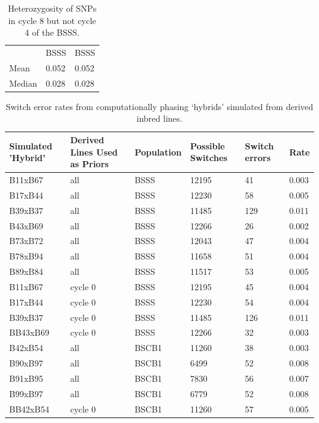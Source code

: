 \begin{table}
\caption{Heterozygosity of SNPs in cycle 8 but not cycle 4 of the BSSS. }
\begin{tabular}{  l | l | l | }
\multicolumn{1}{l}{} & \multicolumn{1}{l}{BSSS} & \multicolumn{1}{l}{BSSS}   \\ \cline{2-3}
	Mean & 0.052 & 0.052   \\ \cline{2-3}
	Median & 0.028 & 0.028   \\ \cline{2-3}
\end{tabular}
\end{table}



\begin{table}
\caption{Switch error rates from computationally phasing ‘hybrids’ simulated from derived inbred lines.}
\begin{tabular}{ | l | l | l | l | l | l | }

\hline
	\textbf{Simulated 'Hybrid'} & \textbf{Derived Lines Used as Priors} & \textbf{Population} & \textbf{Possible Switches} & \textbf{Switch errors} & \textbf{Rate} \\ \hline
	B11xB67 & all & BSSS & 12195 & 41 & 0.003 \\ \hline
	B17xB44 & all & BSSS & 12230 & 58 & 0.005 \\ \hline
	B39xB37 & all & BSSS & 11485 & 129 & 0.011 \\ \hline
	B43xB69 & all & BSSS & 12266 & 26 & 0.002 \\ \hline
	B73xB72 & all & BSSS & 12043 & 47 & 0.004 \\ \hline
	B78xB94 & all & BSSS & 11658 & 51 & 0.004 \\ \hline
	B89xB84 & all & BSSS & 11517 & 53 & 0.005 \\ \hline
	B11xB67 & cycle 0 & BSSS & 12195 & 45 & 0.004 \\ \hline
	B17xB44 & cycle 0 & BSSS & 12230 & 54 & 0.004 \\ \hline
	B39xB37 & cycle 0 & BSSS & 11485 & 126 & 0.011 \\ \hline
	BB43xB69 & cycle 0 & BSSS & 12266 & 32 & 0.003 \\ \hline
	B42xB54 & all & BSCB1 & 11260 & 38 & 0.003 \\ \hline
	B90xB97 & all & BSCB1 & 6499 & 52 & 0.008 \\ \hline
	B91xB95 & all & BSCB1 & 7830 & 56 & 0.007 \\ \hline
	B99xB97 & all & BSCB1 & 6779 & 52 & 0.008 \\ \hline
	BB42xB54 & cycle 0 & BSCB1 & 11260 & 57 & 0.005 \\\hline
\end{tabular}
	\label{tab:s3}  %
\end{table}